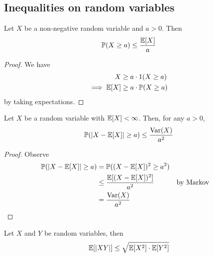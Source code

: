 \documentclass{../template/note}
\begin{document}
    \subsection{Inequalities on random variables}

    \begin{proposition}
        Let \(X\) be a non-negative random variable and \(a > 0\). Then
        \begin{align*}
            \mathbb P(X \geq a) \leq \frac{\mathbb E[X]}{a}
        \end{align*}
    \end{proposition}
    
    \begin{proof}
        We have
        \begin{align*}
            X &\geq a \cdot 1(X \geq a) \\
            \implies \mathbb E[X] &\geq a \cdot \mathbb P(X \geq a)
        \end{align*}
        by taking expectations.
    \end{proof}
    
    \begin{proposition}
        Let \(X\) be a random variable with \(\mathbb E[X] < \infty\). Then, for any \(a > 0\),
        \begin{align*}
            \mathbb P(|X - \mathbb E[X]| \geq a) \leq \frac{\operatorname{Var}(X)}{a^2}
        \end{align*}
    \end{proposition}
    
    \begin{proof}
        Observe
        \begin{align*}
            \mathbb P(|X-\mathbb E[X]| \geq a) &= \mathbb P((X-\mathbb E[X])^2 \geq a^2) \\
            &\leq \frac{\mathbb E[(X-\mathbb E[X])^2]}{a^2} && \text{by Markov}\\
            &= \frac{\operatorname{Var}(X)}{a^2}
        \end{align*}
    \end{proof}
    
    \begin{proposition}
        Let \(X\) and \(Y\) be random variables, then
        \begin{align*}
            \mathbb E[|XY|] \leq \sqrt{\mathbb E[X^2] \cdot \mathbb E[Y^2]}
        \end{align*}
    \end{proposition}
    
\end{document}
